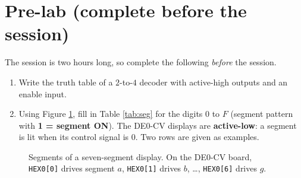 \documentclass{article}
\begin{document}
\section*{Pre-lab (complete before the session)}
The session is two hours long, so complete the following \emph{before} the session.
\begin{enumerate}
    \item Write the truth table of a $2$-to-$4$ decoder with active-high outputs and an enable input.
    \item Using Figure \ref{fig:seg}, fill in Table \ref{tab:seg} for the digits $0$ to $F$ (segment pattern with \textbf{1 = segment ON}). The DE0-CV displays are \textbf{active-low}: a segment is lit when its control signal is $0$. Two rows are given as examples.
\end{enumerate}

\begin{figure}[H]
    \centering
    \caption{Segments of a seven-segment display. On the DE0-CV board, \texttt{HEX0[0]} drives segment $a$, \texttt{HEX0[1]} drives $b$, \ldots, \texttt{HEX0[6]} drives $g$.}
    \label{fig:seg}
\end{figure}
\end{document}
